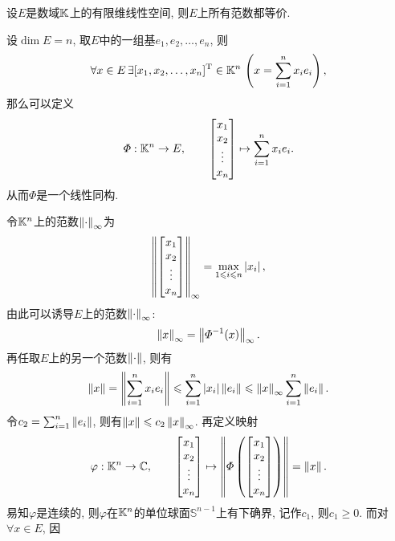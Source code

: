 	\begin{Theorem}
	设$ E $是数域$ \mathbb{K} $上的有限维线性空间, 则$ E $上所有范数都等价.
	\end{Theorem}
	\begin{Proof}
	设$ \dim E=n $, 取$ E $中的一组基$ e_1,e_2, \dots,e_n $, 则
	\[
	\forall x\in E\,\exists[x_1,x_2, \dots,x_n]^\mathrm{T}\in\mathbb{K}^n\,\left( x=\sum_{i=1}^nx_ie_i \right),
	\]
	那么可以定义
	\[
	\varPhi : \mathbb{K}^n\to E,\qquad \begin{bmatrix}
	x_1\\x_2\\\vdots\\x_n
	\end{bmatrix}\mapsto\sum_{i=1}^nx_ie_i.
	\]
	从而$ \varPhi $是一个线性同构.

	令$ \mathbb{K}^n $上的范数$ \left\| \cdot \right\|_\infty $为
	\[
	\left\| \begin{bmatrix}x_1\\x_2\\\vdots\\x_n\end{bmatrix} \right\|_\infty=\max_{1\leqslant i\leqslant n}\left| x_i \right| ,
	\]
	由此可以诱导$ E $上的范数$ \left\| \cdot \right\|_\infty $:
	\[
	\left\| x \right\|_\infty=\left\| \varPhi^{-1}(x) \right\|_\infty.
	\]
	再任取$ E $上的另一个范数$ \left\| \cdot \right\| $, 则有
	\[
	\left\| x \right\|=\left\| \sum_{i=1}^nx_ie_i \right\|\leqslant\sum_{i=1}^n\left| x_i \right| \left\| e_i \right\|\leqslant\left\| x \right\|_\infty\sum_{i=1}^n\left\| e_i \right\|.
	\]
	令$ c_2=\sum_{i=1}^n\left\| e_i \right\| $, 则有$ \left\| x \right\|\leqslant c_2\left\| x \right\|_\infty $. 再定义映射
	\[
	\varphi : \mathbb{K}^n\to\mathbb{C},\qquad\begin{bmatrix}x_1\\x_2\\\vdots\\x_n\end{bmatrix}\mapsto\left\| \varPhi\left(\begin{bmatrix}
	x_1\\x_2\\\vdots\\x_n
	\end{bmatrix}\right) \right\|=\left\| x \right\|.
	\]
	易知$ \varphi $是连续的, 则$ \varphi $在$ \mathbb{K}^n $的单位球面$ \mathbb{S}^{n-1} $上有下确界, 记作$ c_1 $, 则$ c_1\geqslant 0 $. 而对$ \forall x\in E $, 因
	\[
\]
\end{Proof}
